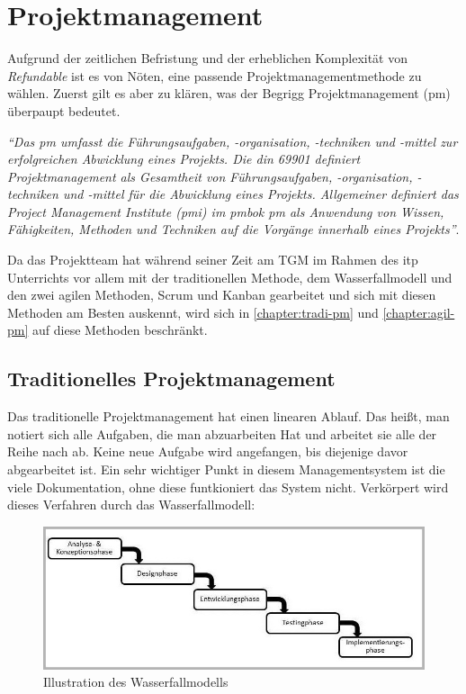 \chapter{Projektmanagement}
Aufgrund der zeitlichen Befristung und der erheblichen Komplexität von \textit{Refundable} ist es von Nöten, eine passende Projektmanagementmethode zu wählen. Zuerst gilt es aber zu klären, was der Begrigg Projektmanagement (\Gls{pm}) überpaupt bedeutet.\\
\begin{center}
	\textit{\enquote{Das \Gls{pm} umfasst die Führungsaufgaben, -organisation, -techniken und -mittel zur erfolgreichen Abwicklung eines Projekts. Die \Gls{din} 69901 definiert Projektmanagement als Gesamtheit von Führungsaufgaben, -organisation, -techniken und -mittel für die Abwicklung eines Projekts. Allgemeiner definiert das Project Management Institute (\Gls{pmi}) im \Gls{pmbok} \Gls{pm} als Anwendung von Wissen, Fähigkeiten, Methoden und Techniken auf die Vorgänge innerhalb eines Projekts}}\cite{pm-definition}.
\end{center}
Da das Projektteam hat während seiner Zeit am TGM im Rahmen des \Gls{itp} Unterrichts vor allem mit der traditionellen Methode, dem Wasserfallmodell und den zwei agilen Methoden, Scrum und Kanban gearbeitet und sich mit diesen Methoden am Besten auskennt, wird sich in \autoref{chapter:tradi-pm} und \autoref{chapter:agil-pm} auf diese Methoden beschränkt.
\newpage
\section{Traditionelles Projektmanagement}
\label{chapter:tradi-pm}
Das traditionelle Projektmanagement hat einen linearen Ablauf. Das heißt, man notiert sich alle Aufgaben, die man abzuarbeiten Hat und arbeitet sie alle der Reihe nach ab. Keine neue Aufgabe wird angefangen, bis diejenige davor abgearbeitet ist. Ein sehr wichtiger Punkt in diesem Managementsystem ist die viele Dokumentation, ohne diese funtkioniert das System nicht. Verkörpert wird dieses Verfahren durch das Wasserfallmodell:
\begin{figure}[H]
	\centering
	\includegraphics[width=0.7\linewidth]{images/projektmanagement/wasserfallmodell}
	\caption[Wasserfallmodell]{Illustration des Wasserfallmodells \cite{pm-wasserfall-online}}
	\label{fig:wasserfall}
\end{figure}
